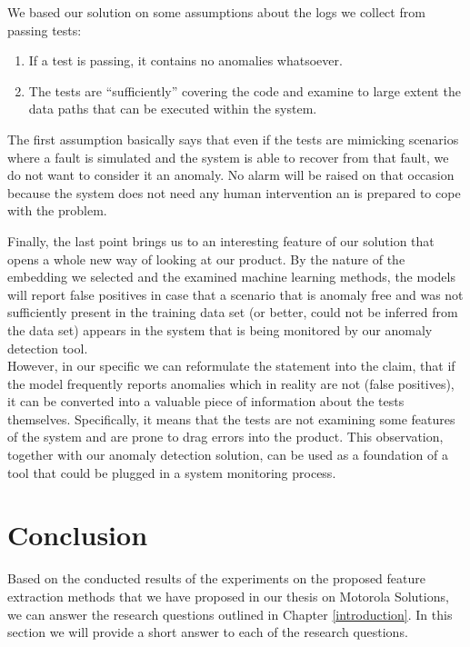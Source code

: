 We based our solution on some assumptions about the logs we collect from passing tests:
\begin{enumerate}

    \item If a test is passing, it contains no anomalies whatsoever.
    \item The tests are “sufficiently” covering the code and examine to large extent the data paths that can be executed within the system. 

\end{enumerate}

The first assumption basically says that even if the tests are mimicking scenarios where a fault is simulated and the system is able to recover from that fault, we do not want to consider it an anomaly. 
No alarm will be raised on that occasion because the system does not need any human intervention an is prepared to cope with the problem.


Finally, the last point brings us to an interesting feature of our solution that opens a whole new way of looking at our product.
By the nature of the embedding we selected and the examined machine learning methods, the models will report false positives in case that a scenario that is anomaly free and was not sufficiently present in the training data set (or better, could not be inferred from the data set) appears in the system that is being monitored by our anomaly detection tool.\\
However, in our specific we can reformulate the statement into the claim, that if the model frequently reports anomalies which in reality are not (false positives), it can be converted into  a valuable piece of information about the tests themselves. 
Specifically, it means that the tests are not examining some features of the system and are prone to drag errors into the product. 
This observation, together with our anomaly detection solution, can be used as a foundation of a tool that could be plugged in a system monitoring process.
\section{Conclusion}

Based on the conducted results of the experiments on the proposed feature extraction methods that we have proposed in our thesis on Motorola Solutions, we can answer the research questions outlined in Chapter \ref{introduction}. In this section we will provide a short answer to each of the research questions.

